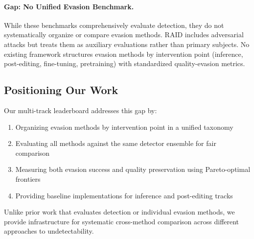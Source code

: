 \paragraph{Gap: No Unified Evasion Benchmark.} While these benchmarks comprehensively evaluate detection, they do not systematically organize or compare evasion methods. RAID includes adversarial attacks but treats them as auxiliary evaluations rather than primary subjects. No existing framework structures evasion methods by intervention point (inference, post-editing, fine-tuning, pretraining) with standardized quality-evasion metrics.

\subsection{Positioning Our Work}

Our multi-track leaderboard addresses this gap by:
\begin{enumerate}
    \item Organizing evasion methods by intervention point in a unified taxonomy
    \item Evaluating all methods against the same detector ensemble for fair comparison
    \item Measuring both evasion success and quality preservation using Pareto-optimal frontiers
    \item Providing baseline implementations for inference and post-editing tracks
\end{enumerate}

Unlike prior work that evaluates detection or individual evasion methods, we provide infrastructure for systematic cross-method comparison across different approaches to undetectability.
